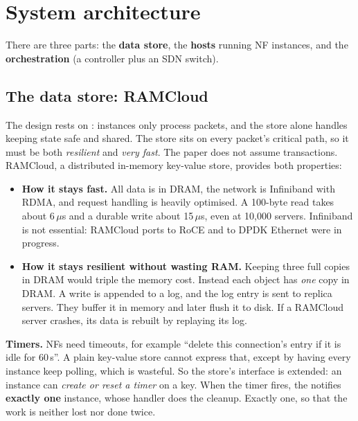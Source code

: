 \section{System architecture}


There are three parts: the \textbf{data store}, the \textbf{hosts} running NF instances, and the \textbf{orchestration} (a controller plus an
SDN switch).

\subsection{The data store: RAMCloud}
The design rests on : instances only process packets, and the store alone handles keeping state safe and
shared. The store sits on every packet's critical path, so it must be both \emph{resilient} and \emph{very fast}. The paper does not assume
transactions. RAMCloud, a distributed in-memory key-value store, provides both properties:
\begin{itemize}
  \item \textbf{How it stays fast.} All data is in DRAM, the network is Infiniband with RDMA, and request handling is heavily optimised. A 100-byte
        read takes about 6\,$\mu$s and a durable write about 15\,$\mu$s, even at 10,000 servers. Infiniband is not essential: RAMCloud ports to RoCE and
        to DPDK Ethernet were in progress.
  \item \textbf{How it stays resilient without wasting RAM.} Keeping three full copies in DRAM would triple the memory cost. Instead each object has
        \emph{one} copy in DRAM. A write is appended to a log, and the log entry is sent to replica servers. They buffer it in memory and later
        flush it to disk. If a RAMCloud server crashes, its data is rebuilt by replaying its log.
\end{itemize}

\textbf{Timers.} NFs need timeouts, for example ``delete this connection's entry if it is idle for 60\,s''. A plain key-value store cannot
express that, except by having every instance keep polling, which is wasteful. So the store's interface is extended: an instance can
\emph{create or reset a timer} on a key. When the timer fires, the  notifies \textbf{exactly one} instance, whose handler
does the cleanup. Exactly one, so that the work is neither lost nor done twice.

